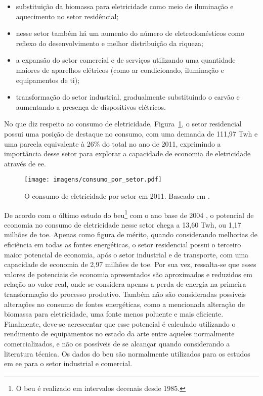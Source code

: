 \begin{itemize}
\item substituição da biomassa para eletricidade como meio de iluminação 
e aquecimento
no setor residêncial;
\item nesse setor também há um aumento do número de eletrodomésticos como
reflexo do desenvolvimento e melhor distribuição da riqueza;
\item a expansão do setor comercial e de serviços utilizando uma quantidade
maiores de aparelhos elétricos (como ar condicionado, iluminação e equipamentos
de \acs{ti}); 
\item transformação do setor industrial, gradualmente substituindo o carvão e 
aumentando a presença de dispositivos elétricos.
\end{itemize}

No que diz respeito ao consumo de eletricidade, 
Figura~\ref{fig:eletricidade_por_setor}, 
o setor residencial possui uma posição de destaque no consumo, com uma demanda
de 111,97 T\acs{wh} e uma parcela equivalente à 26\% do total no ano de 2011, 
exprimindo a importância desse setor para explorar a capacidade de economia de 
eletricidade através de \gls{ee}. 

\begin{figure}[h!t]
\centering
\texttt{[image: imagens/consumo\_por\_setor.pdf]}
\caption[Consumo de eletricidade por setor em 2011.]
{O consumo de eletricidade por setor em 2011. Baseado em \cite{ben2012}.}
\label{fig:eletricidade_por_setor}
\end{figure}

De acordo com o último estudo do \gls{beu}\footnote{O \gls{beu} é
realizado em intervalos decenais desde 1985.} com o ano base de 2004
\cite{beu}, o potencial de economia no consumo de eletricidade nesse
setor chega a 13,60 T\acs{wh}, ou 1,17 milhões de \acs{toe}.
Apenas como figura de mérito, quando considerando melhorias de
eficiência em todas as fontes energéticas, o setor residencial possui
o terceiro maior potencial de economia, após o setor industrial e de
transporte, com uma capacidade de economia de 2,97 milhões de
\acs{toe}. Por sua vez, ressalta-se que esses valores de
potenciais de economia apresentados são aproximados e reduzidos em
relação ao valor real, onde se considera apenas a perda de energia na
primeira transformação do processo produtivo. Também não são
consideradas possíveis alterações no consumo de fontes energéticas,
como a mencionada alteração de biomassa para eletricidade, uma fonte
menos poluente e mais eficiente. Finalmente, deve-se acrescentar que
esse potencial é calculado utilizando o rendimento de equipamentos no
estado da arte entre aqueles normalmente comercializados, e não os
possíveis de se alcançar quando considerando a literatura técnica. Os
dados  do \gls{beu} são normalmente utilizados para os estudos em
\gls{ee} para o setor industrial e comercial.

